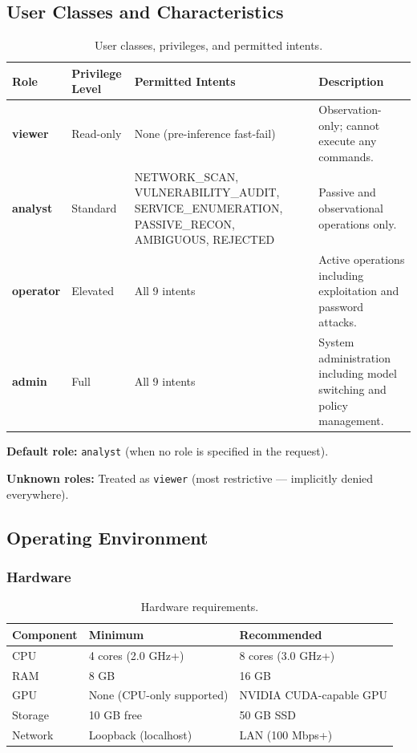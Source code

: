 \documentclass[10pt,journal,onecolumn]{IEEEtran}
\begin{document}
\subsection{User Classes and Characteristics}
\begin{table}[t]
\caption{User classes, privileges, and permitted intents.}
\label{tab:roles}
\begin{tabularx}{\textwidth}{l l X l}
\toprule
\textbf{Role} & \textbf{Privilege Level} & \textbf{Permitted Intents} & \textbf{Description}\\
\midrule
\textbf{viewer} & Read-only & None (pre-inference fast-fail) & Observation-only; cannot execute any commands.\\
\textbf{analyst} & Standard & NETWORK\_SCAN, VULNERABILITY\_AUDIT, SERVICE\_ENUMERATION, PASSIVE\_RECON, AMBIGUOUS, REJECTED & Passive and observational operations only.\\
\textbf{operator} & Elevated & All 9 intents & Active operations including exploitation and password attacks.\\
\textbf{admin} & Full & All 9 intents & System administration including model switching and policy management.\\
\bottomrule
\end{tabularx}
\end{table}

\textbf{Default role:} \texttt{analyst} (when no role is specified in the request).

\textbf{Unknown roles:} Treated as \texttt{viewer} (most restrictive --- implicitly denied everywhere).

\subsection{Operating Environment}

\subsubsection{Hardware}
\begin{table}[h]
\caption{Hardware requirements.}
\label{tab:hardware}
\begin{tabularx}{\columnwidth}{l X X}
\toprule
\textbf{Component} & \textbf{Minimum} & \textbf{Recommended}\\
\midrule
CPU & 4 cores (2.0 GHz+) & 8 cores (3.0 GHz+)\\
RAM & 8 GB & 16 GB\\
GPU & None (CPU-only supported) & NVIDIA CUDA-capable GPU\\
Storage & 10 GB free & 50 GB SSD\\
Network & Loopback (localhost) & LAN (100 Mbps+)\\
\bottomrule
\end{tabularx}
\end{table}
\end{document}
